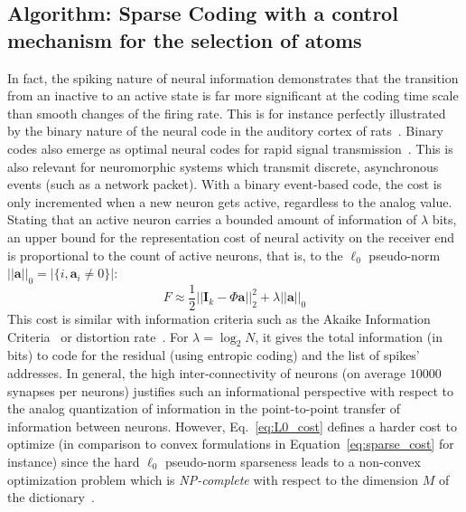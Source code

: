 \documentclass[draft]{article} %
\newcommand{\coef}{\mathbf{a}} %
\newcommand{\image}{\mathbf{I}} %
\newcommand{\dico}{\Phi} %
\newcommand{\enscond}[2]{\lbrace #1, #2 \rbrace}
\newcommand{\norm}[1]{|\!| #1 |\!|}
\newcommand{\abs}[1]{\left|#1\right|}
\newcommand{\seeEq}[1]{Eq.~\ref{eq:#1}}%
\begin{document}
\subsection{Algorithm: Sparse Coding with a control mechanism for the selection of atoms}
In fact, the spiking nature of neural information demonstrates that the transition from an inactive to an active state is far more significant at the coding time scale than smooth changes of the firing rate.
This is for instance perfectly illustrated by the binary nature of the neural code in the auditory cortex of rats~\citep{DeWeese03}. Binary codes also emerge as optimal neural codes for rapid signal transmission~\citep{Bethge03}. This is also relevant for neuromorphic systems which transmit discrete, asynchronous events (such as a network packet). With a binary event-based code, the cost is only incremented when a new neuron gets active, regardless to the analog value. Stating that an active neuron carries a bounded amount of information of $\lambda$ bits, an upper bound for the representation cost of neural activity on the receiver end is proportional to the count of active neurons, that is, to the $\ell_0$ pseudo-norm $\norm{\coef}_0 = \abs{\enscond{i}{\coef_i \neq 0}}$:%
\begin{equation}%
F \approx  \frac{1}{2} \norm{\image_k - \dico \coef}_2^2 + \lambda\norm{\coef}_0%
\label{eq:L0_cost}%
\end{equation}%
This cost is similar with information criteria such as the Akaike Information Criteria~\citep{Akaike74} or distortion rate~\citep[p.~571]{Mallat98}. For $\lambda=\log_2 N$, it gives the total information (in bits) to code for the residual (using entropic coding) and the list of spikes' addresses. In general, the high inter-connectivity of neurons (on average $10000$ synapses per neurons) justifies such an informational perspective with respect to the analog quantization of information in the point-to-point transfer of information between neurons.
However, \seeEq{L0_cost} defines a harder cost to optimize (in comparison to convex formulations in Equation~\ref{eq:sparse_cost} for instance) since the hard $\ell_0$ pseudo-norm sparseness leads to a non-convex optimization problem which is \emph{NP-complete} with respect to the dimension $M$ of the dictionary~\citep[p.~418]{Mallat98}.
\end{document}
